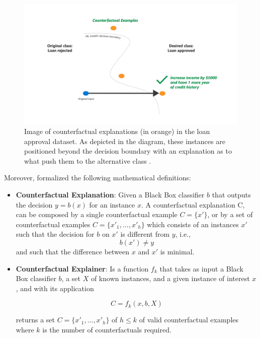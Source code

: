  \begin{figure}[h]
    \centering
    \includegraphics[width=1\textwidth]{images/counterfactual.png}
    \caption{Image of counterfactual explanations (in orange) in the loan approval dataset. As depicted in the diagram, these instances are positioned beyond the decision boundary with an explanation as to what push them to the alternative class \cite{dice_docs}.}
    \label{fig:tax-xai}
\end{figure}



Moreover, \citet{guidotti2024counterfactual} formalized the following mathematical definitions:

\begin{itemize}
    \item \textbf{Counterfactual Explanation}: Given a Black Box classifier $b$ that outputs the decision $y = b(x)$ for an instance $x$. A counterfactual explanation C, can be composed by a single counterfactual example $C = \{x'\}$, or by a set of counterfactual examples $C = \{x'_1, . . . , x'_h \}$ which consists of an instances $x'$ such that the decision for $b$ on $x'$ is different from $y$, i.e., 
\[
b(x') \neq y
\]
and such that the difference between $x$ and $x'$ is minimal.

\item \textbf{Counterfactual Explainer}: Is a function $f_k$ that takes as input a Black Box classifier $b$, a set $X$ of known instances, and a given instance of
interest $x$, and with its application

\[
C = f_k(x, b, X)
\]

returns a set $C = \{x'_1, . . . , x'_h \}$ of $h\leq k$ of valid counterfactual examples where $k$ is the number of counterfactuals required.
\end{itemize}

